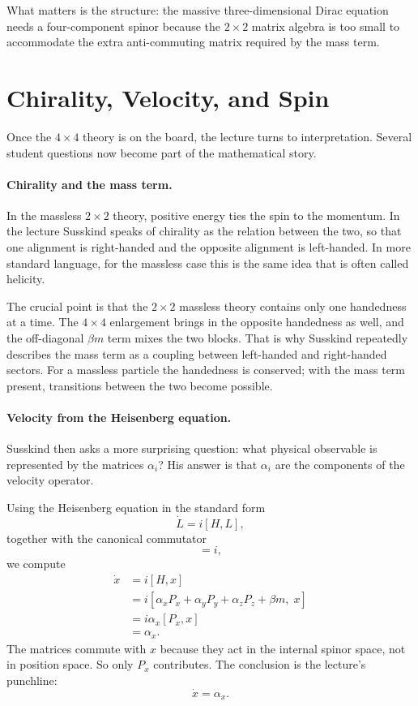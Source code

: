 What matters is the structure: the massive three-dimensional Dirac equation needs a four-component spinor because the \(2\times2\) matrix algebra is too small to accommodate the extra anti-commuting matrix required by the mass term.

\section{Chirality, Velocity, and Spin}

Once the \(4\times4\) theory is on the board, the lecture turns to interpretation. Several student questions now become part of the mathematical story.

\paragraph{Chirality and the mass term.}
In the massless \(2\times2\) theory, positive energy ties the spin to the momentum. In the lecture Susskind speaks of chirality as the relation between the two, so that one alignment is right-handed and the opposite alignment is left-handed. In more standard language, for the massless case this is the same idea that is often called helicity.

The crucial point is that the \(2\times2\) massless theory contains only one handedness at a time. The \(4\times4\) enlargement brings in the opposite handedness as well, and the off-diagonal \(\beta m\) term mixes the two blocks. That is why Susskind repeatedly describes the mass term as a coupling between left-handed and right-handed sectors. For a massless particle the handedness is conserved; with the mass term present, transitions between the two become possible.

\paragraph{Velocity from the Heisenberg equation.}
Susskind then asks a more surprising question: what physical observable is represented by the matrices \(\alpha_i\)? His answer is that \(\alpha_i\) are the components of the velocity operator.

Using the Heisenberg equation in the standard form
\begin{equation}
\dot L=i[H,L],
\end{equation}
together with the canonical commutator
\begin{equation}
[x,P_x]=i,
\end{equation}
we compute
\begin{align}
\dot x
&=i[H,x] \\
&=i[\alpha_xP_x+\alpha_yP_y+\alpha_zP_z+\beta m,\;x] \\
&=i\alpha_x[P_x,x] \\
&=\alpha_x.
\end{align}
The matrices commute with \(x\) because they act in the internal spinor space, not in position space. So only \(P_x\) contributes. The conclusion is the lecture's punchline:
\begin{equation}
\dot x=\alpha_x.
\end{equation}

